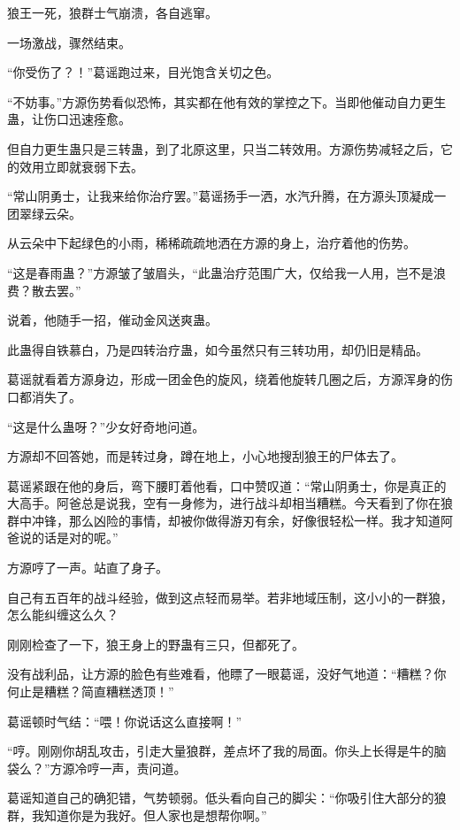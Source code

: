 
\begin{this_body}

狼王一死，狼群士气崩溃，各自逃窜。

一场激战，骤然结束。

“你受伤了？！”葛谣跑过来，目光饱含关切之色。

“不妨事。”方源伤势看似恐怖，其实都在他有效的掌控之下。当即他催动自力更生蛊，让伤口迅速痊愈。

但自力更生蛊只是三转蛊，到了北原这里，只当二转效用。方源伤势减轻之后，它的效用立即就衰弱下去。

“常山阴勇士，让我来给你治疗罢。”葛谣扬手一洒，水汽升腾，在方源头顶凝成一团翠绿云朵。

从云朵中下起绿色的小雨，稀稀疏疏地洒在方源的身上，治疗着他的伤势。

“这是春雨蛊？”方源皱了皱眉头，“此蛊治疗范围广大，仅给我一人用，岂不是浪费？散去罢。”

说着，他随手一招，催动金风送爽蛊。

此蛊得自铁慕白，乃是四转治疗蛊，如今虽然只有三转功用，却仍旧是精品。

葛谣就看着方源身边，形成一团金色的旋风，绕着他旋转几圈之后，方源浑身的伤口都消失了。

“这是什么蛊呀？”少女好奇地问道。

方源却不回答她，而是转过身，蹲在地上，小心地搜刮狼王的尸体去了。

葛谣紧跟在他的身后，弯下腰盯着他看，口中赞叹道：“常山阴勇士，你是真正的大高手。阿爸总是说我，空有一身修为，进行战斗却相当糟糕。今天看到了你在狼群中冲锋，那么凶险的事情，却被你做得游刃有余，好像很轻松一样。我才知道阿爸说的话是对的呢。”

方源哼了一声。站直了身子。

自己有五百年的战斗经验，做到这点轻而易举。若非地域压制，这小小的一群狼，怎么能纠缠这么久？

刚刚检查了一下，狼王身上的野蛊有三只，但都死了。

没有战利品，让方源的脸色有些难看，他瞟了一眼葛谣，没好气地道：“糟糕？你何止是糟糕？简直糟糕透顶！”

葛谣顿时气结：“喂！你说话这么直接啊！”

“哼。刚刚你胡乱攻击，引走大量狼群，差点坏了我的局面。你头上长得是牛的脑袋么？”方源冷哼一声，责问道。

葛谣知道自己的确犯错，气势顿弱。低头看向自己的脚尖：“你吸引住大部分的狼群，我知道你是为我好。但人家也是想帮你啊。”


\end{this_body}

